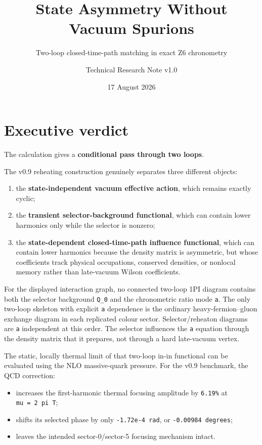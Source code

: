 \documentclass[
  10pt,
  a4paper,
]{article}
\title{State Asymmetry Without Vacuum Spurions}
\subtitle{Two-loop closed-time-path matching in exact Z6 chronometry}
\author{Technical Research Note v1.0}
\date{17 August 2026}
\providecommand{\tightlist}{%
  \setlength{\itemsep}{0pt}\setlength{\parskip}{0pt}}
\begin{document}
\maketitle

{
\hypersetup{linkcolor=}
\setcounter{tocdepth}{2}
\tableofcontents
}
\section{Executive verdict}\label{executive-verdict}

The calculation gives a \textbf{conditional pass through two loops}.

The v0.9 reheating construction genuinely separates three different
objects:

\begin{enumerate}
\def\labelenumi{\arabic{enumi}.}
\tightlist
\item
  the \textbf{state-independent vacuum effective action}, which remains
  exactly cyclic;
\item
  the \textbf{transient selector-background functional}, which can
  contain lower harmonics only while the selector is nonzero;
\item
  the \textbf{state-dependent closed-time-path influence functional},
  which can contain lower harmonics because the density matrix is
  asymmetric, but whose coefficients track physical occupations,
  conserved densities, or nonlocal memory rather than late-vacuum Wilson
  coefficients.
\end{enumerate}

For the displayed interaction graph, no connected two-loop 1PI diagram
contains both the selector background \texttt{Q\_0} and the chronometric
ratio mode \texttt{a}. The only two-loop skeleton with explicit
\texttt{a} dependence is the ordinary heavy-fermion--gluon exchange
diagram in each replicated colour sector. Selector/reheaton diagrams are
\texttt{a} independent at this order. The selector influences the
\texttt{a} equation through the density matrix that it prepares, not
through a hard late-vacuum vertex.

The static, locally thermal limit of that two-loop in-in functional can
be evaluated using the NLO massive-quark pressure. For the v0.9
benchmark, the QCD correction:

\begin{itemize}
\tightlist
\item
  increases the first-harmonic thermal focusing amplitude by
  \texttt{6.19\%} at \texttt{mu\ =\ 2\ pi\ T};
\item
  shifts its selected phase by only \texttt{-1.72e-4\ rad}, or
  \texttt{-0.00984\ degrees};
\item
  leaves the intended sector-0/sector-5 focusing mechanism intact.
\end{itemize}
\end{document}
